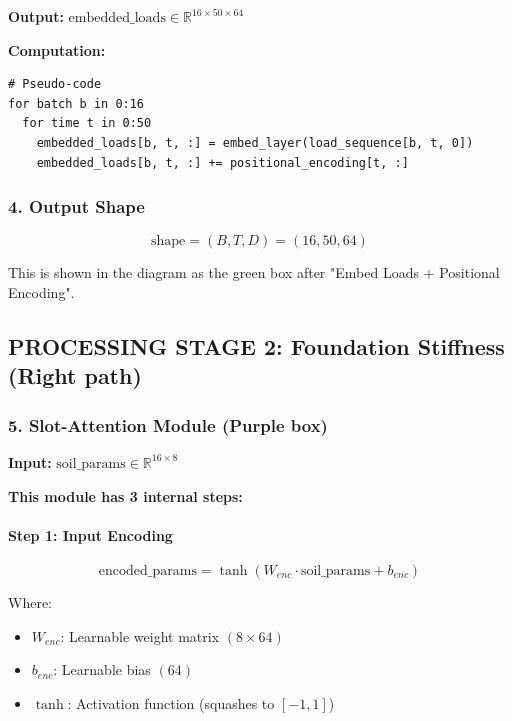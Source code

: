 \documentclass[11pt,a4paper]{article}
\begin{document}
\textbf{Output:} $\text{embedded\_loads} \in \mathbb{R}^{16 \times 50 \times 64}$

\textbf{Computation:}
\begin{lstlisting}
# Pseudo-code
for batch b in 0:16
  for time t in 0:50
    embedded_loads[b, t, :] = embed_layer(load_sequence[b, t, 0])
    embedded_loads[b, t, :] += positional_encoding[t, :]
\end{lstlisting}

\subsubsection{4. Output Shape}

\begin{equation}
\text{shape} = (B, T, D) = (16, 50, 64)
\end{equation}

This is shown in the diagram as the green box after "Embed Loads + Positional Encoding".

\subsection{PROCESSING STAGE 2: Foundation Stiffness (Right path)}

\subsubsection{5. Slot-Attention Module (Purple box)}

\textbf{Input:} $\text{soil\_params} \in \mathbb{R}^{16 \times 8}$

\textbf{This module has 3 internal steps:}

\paragraph{Step 1: Input Encoding}

\begin{equation}
\text{encoded\_params} = \tanh(W_{enc} \cdot \text{soil\_params} + b_{enc})
\end{equation}

Where:
\begin{itemize}
  \item $W_{enc}$: Learnable weight matrix $(8 \times 64)$
  \item $b_{enc}$: Learnable bias $(64)$
  \item $\tanh$: Activation function (squashes to $[-1, 1]$)
\end{itemize}
\end{document}
